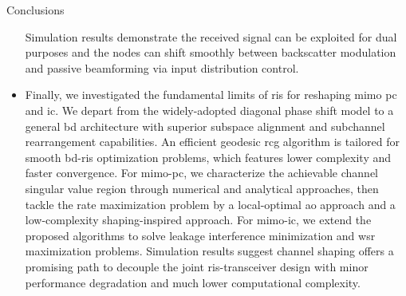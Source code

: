 \begin{section}{Conclusions}
\begin{itemize}
		Simulation results demonstrate the received signal can be exploited for dual purposes and the nodes can shift smoothly between backscatter modulation and passive beamforming via input distribution control.
		\item Finally, we investigated the fundamental limits of \gls{ris} for reshaping \gls{mimo} \gls{pc} and \gls{ic}. We depart from the widely-adopted diagonal phase shift model to a general \gls{bd} architecture with superior subspace alignment and subchannel rearrangement capabilities.
		An efficient geodesic \gls{rcg} algorithm is tailored for smooth \gls{bd}-\gls{ris} optimization problems, which features lower complexity and faster convergence.
		For \gls{mimo}-\gls{pc}, we characterize the achievable channel singular value region through numerical and analytical approaches, then tackle the rate maximization problem by a local-optimal \gls{ao} approach and a low-complexity shaping-inspired approach.
		For \gls{mimo}-\gls{ic}, we extend the proposed algorithms to solve leakage interference minimization and \gls{wsr} maximization problems.
		Simulation results suggest channel shaping offers a promising path to decouple the joint \gls{ris}-transceiver design with minor performance degradation and much lower computational complexity.
	\end{itemize}
\end{section}

